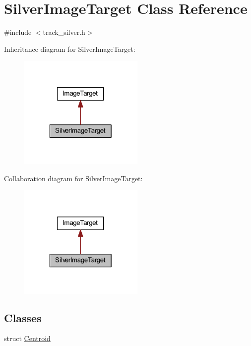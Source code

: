 \hypertarget{class_silver_image_target}{\section{\-Silver\-Image\-Target \-Class \-Reference}
\label{class_silver_image_target}
}


{\ttfamily \#include $<$track\-\_\-silver.\-h$>$}



\-Inheritance diagram for \-Silver\-Image\-Target\-:\nopagebreak
\begin{figure}[H]
\begin{center}
\leavevmode
\includegraphics[width=172pt]{class_silver_image_target__inherit__graph}
\end{center}
\end{figure}


\-Collaboration diagram for \-Silver\-Image\-Target\-:\nopagebreak
\begin{figure}[H]
\begin{center}
\leavevmode
\includegraphics[width=172pt]{class_silver_image_target__coll__graph}
\end{center}
\end{figure}
\subsection*{\-Classes}
\begin{DoxyCompactItemize}
\item 
struct \hyperlink{struct_silver_image_target_1_1_centroid}{\-Centroid}
\end{DoxyCompactItemize}
